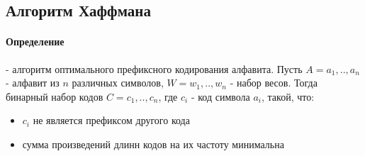 \documentclass[a4paper,10pt]{article}
\begin{document}
\subsection{Алгоритм Хаффмана}
\paragraph{Определение} - алгоритм оптимального префиксного кодирования алфавита. Пусть $A = {a_1,.., a_n}$ - алфавит из $n$ различных символов, $W = {w_1,.., w_n}$ - набор весов. Тогда бинарный набор кодов $C = {c_1,.., c_n}$, где $c_i$ - код символа $a_i$, такой, что:
\begin{itemize}
	\item $c_i$ не является префиксом другого кода 
	\item сумма произведений длинн кодов на их частоту минимальна
\end{itemize}
\end{document}
